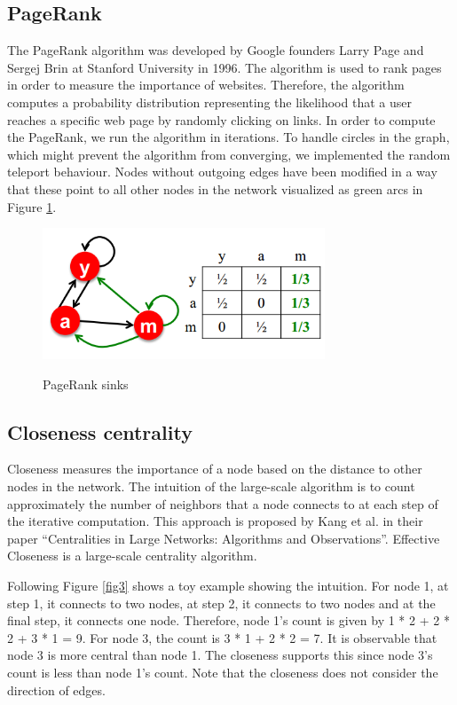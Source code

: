 \subsection{PageRank}
The PageRank algorithm was developed by Google founders Larry Page and Sergej Brin at Stanford University in 1996. The algorithm is used to rank pages in order to measure the importance of websites. Therefore, the algorithm computes a probability distribution representing the likelihood that a user reaches a specific web page by randomly clicking on links. In order to compute the PageRank, we run the algorithm in iterations. To handle circles in the graph, which might prevent the algorithm from converging, we implemented the random teleport behaviour. Nodes without outgoing edges have been modified in a way that these point to all other nodes in the network visualized as green arcs in Figure \ref{fig2}.

\begin{figure}[H]
	\begin{center}
		\label{fig2}		
		\includegraphics[width=0.75\textwidth]{fig2}	
		\caption{PageRank sinks}	
	\end{center}
\end{figure}

\subsection{Closeness centrality}
Closeness measures the importance of a node based on the distance to other nodes in the network. The intuition of the large-scale algorithm is to count approximately the number of neighbors that a node connects to at each step of the iterative computation. This approach is proposed by Kang et al. in their paper “Centralities in Large Networks: Algorithms and Observations”. Effective Closeness is a large-scale centrality algorithm. 

Following Figure \ref{fig3} shows a toy example showing the intuition. For node 1, at step 1, it connects to two nodes, at step 2, it connects to two nodes and at the final step, it  connects one node. Therefore, node 1’s count is given by 1 * 2 + 2 * 2 + 3 * 1 = 9. For node 3, the count is 3 * 1 + 2 * 2 = 7. It is observable that node 3 is more central than node 1. The closeness supports this since node 3’s count is less than node 1’s count. Note that the closeness does not consider the direction of edges.

